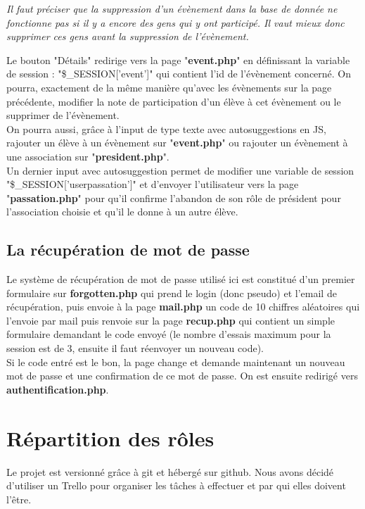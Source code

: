 \documentclass[french]{article}
\begin{document}
	\textit{Il faut préciser que la suppression d'un évènement dans la base de donnée ne fonctionne pas si il y a encore des gens qui y ont participé. Il vaut mieux donc supprimer ces gens avant la suppression de l'évènement.\\}
	
	Le bouton "Détails" redirige vers la page "\textbf{event.php}" en définissant la variable de session : "\$\_SESSION['event']" qui contient l'id de l'évènement concerné. On pourra, exactement de la même manière qu'avec les évènements sur la page précédente, modifier la note de participation d'un élève à cet évènement ou le supprimer de l'évènement. \\
	
	On pourra aussi, grâce à l'input de type texte avec autosuggestions en JS, rajouter un élève à un évènement sur "\textbf{event.php}" ou rajouter un évènement à une association sur "\textbf{president.php}".\\
	
	Un dernier input avec autosuggestion permet de modifier une variable de session "\$\_SESSION['userpassation']" et d'envoyer l'utilisateur vers la page "\textbf{passation.php}" pour qu'il confirme l'abandon de son rôle de président pour l'association choisie et qu'il le donne à un autre élève.

\subsection{La récupération de mot de passe}
Le système de récupération de mot de passe utilisé ici est constitué d'un premier formulaire sur \textbf{forgotten.php} qui prend le login (donc pseudo) et l'email de récupération, puis envoie à la page \textbf{mail.php} un code de 10 chiffres aléatoires qui l'envoie par mail puis renvoie sur la page \textbf{recup.php} qui contient un simple formulaire demandant le code envoyé (le nombre d'essais maximum pour la session est de 3, ensuite il faut réenvoyer un nouveau code).\\

Si le code entré est le bon, la page change et demande maintenant un nouveau mot de passe et une confirmation de ce mot de passe. On est ensuite redirigé vers \textbf{authentification.php}. 

\section{Répartition des rôles}
Le projet est versionné grâce à git et hébergé sur github. Nous avons décidé d'utiliser un Trello pour organiser les tâches à effectuer et par qui elles doivent l'être.\\
\end{document}
